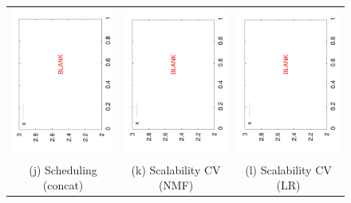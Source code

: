 \documentclass{vldb}
\begin{document}
{\begin{figure}
\begin{tabular}{ccc}
\includegraphics[angle=-90,width=2.3in]{blank.pdf} &
\hspace*{-0.2in}
\includegraphics[angle=-90,width=2.3in]{blank.pdf} &
\hspace*{-0.2in}
\includegraphics[angle=-90,width=2.3in]{blank.pdf} \\
(j) Scheduling (concat) & (k) Scalability CV (NMF) & (l) Scalability CV (LR) \\


\end{tabular}
\end{figure}}
\end{document}
